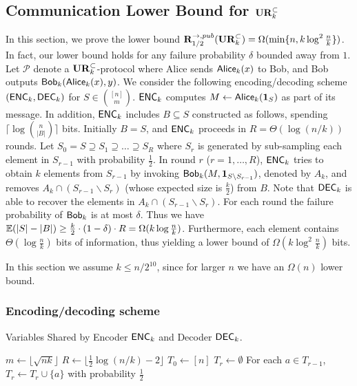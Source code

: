 \subsection{Communication Lower Bound for $\mathbf{UR}_k^\subset$}\label{sec:k-samples-lb}

In this section, we prove the lower bound $\mathbf{R}^{\rightarrow,pub}_{1/2}(\mathbf{UR}^\subset_k) = \Omega(\min\{n, k\log^2 \frac{n}{k}\})$. In fact, our lower bound holds for any failure probability $\delta$ bounded away from $1$. Let $\mathcal{P}$ denote a $\mathbf{UR}_k^\subset$-protocol where Alice sends $\mathsf{Alice}_k(x)$ to Bob, and Bob outputs $\mathsf{Bob}_k(\mathsf{Alice}_k(x), y)$.  We consider the following encoding/decoding scheme $(\textsf{ENC}_k, \textsf{DEC}_k)$ for $S\in {[n] \choose m}$.  $\textsf{ENC}_k$ computes $M\leftarrow \mathsf{Alice}_k(\mathbf{1}_S)$ as part of its message. In addition, $\textsf{ENC}_k$ includes $B\subseteq S$ constructed as follows, spending $\lceil\log{n\choose |B|}\rceil$ bits.  Initially $B= S$, and $\textsf{ENC}_k$ proceeds in $R=\Theta(\log (n/k))$ rounds.  Let $S_0=S\supseteq S_1\supseteq \ldots \supseteq S_R$ where $S_r$ is generated by sub-sampling each element in $S_{r-1}$ with probability $\frac{1}{2}$.  In round $r$ ($r=1,\ldots, R$), $\textsf{ENC}_k$ tries to obtain $k$ elements from $S_{r-1}$ by invoking $\mathsf{Bob}_k(M, \mathbf{1}_{S\backslash S_{r-1}})$, denoted by $A_k$, and removes $A_k\cap (S_{r-1}\backslash S_{r})$ (whose expected size is $\frac{k}{2}$) from $B$.  Note that $\textsf{DEC}_k$ is able to recover the elements in $A_k\cap (S_{r-1}\backslash S_{r})$.  For each round the failure probability of $\mathsf{Bob}_k$ is at most $\delta$.  Thus we have $\operatorname*{\mathbb{E}}(|S|-|B|)\ge \frac{k}{2}\cdot (1-\delta) \cdot R=\Omega(k\log\frac{n}{k})$.  Furthermore, each element contains $\Theta(\log \frac{n}{k})$ bits of information, thus yielding a lower bound of $\Omega(k\log^2\frac{n}{k})$ bits.

In this section we assume $k \le n/2^{10}$, since for larger $n$ we have an $\Omega(n)$ lower bound.

\subsubsection{Encoding/decoding scheme}
\begin{algorithm}[H] 
  \caption{Variables Shared by Encoder $\textsf{ENC}_k$ and Decoder $\textsf{DEC}_k$.} \label{algo:para4}
  \begin{algorithmic}[1] 
    \State $m\leftarrow \lfloor \sqrt{nk} \rfloor$
    \State $R\leftarrow \lfloor \frac{1}{2}\log (n/k) - 2 \rfloor$ 
    \State $T_0\leftarrow [n]$
      \State $T_r\leftarrow \emptyset$
      \State For each $a\in T_{r-1}$, $T_r\leftarrow T_r\cup \{a\}$ with probability $\frac{1}{2}$ 
    \EndFor
  \end{algorithmic}
\end{algorithm}

